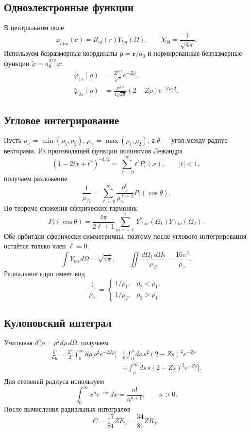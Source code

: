 \documentclass[../final.tex]{subfiles}
\begin{document}
\subsection*{Одноэлектронные функции}

В центральном поле
\[
    \varphi_{nlm}(\mathbf r)=R_{nl}(r)Y_{lm}(\Omega),\qquad
    Y_{00}=\frac1{\sqrt{4\pi}}.
\]
Используем безразмерные координаты $\boldsymbol\rho=\mathbf r/a_0$
и нормированные безразмерные функции
$\widetilde\varphi=a_0^{3/2}\varphi$:
\begin{align*}
    \widetilde\varphi_{1s}(\rho)
       &=\frac{Z^{3/2}}{\sqrt\pi}e^{-Z\rho},\\
    \widetilde\varphi_{2s}(\rho)
       &=\frac{Z^{3/2}}{4\sqrt{2\pi}}
           (2-Z\rho)e^{-Z\rho/2}.
\end{align*}

\subsection*{Угловое интегрирование}

Пусть $\rho_< =\min(\rho_1,\rho_2)$,
$\rho_> =\max(\rho_1,\rho_2)$, а $\theta$ --- угол между радиус-векторами.
Из производящей функции полиномов Лежандра
\[
    (1-2tx+t^2)^{-1/2}=\sum_{\ell=0}^\infty t^\ell P_\ell(x),
    \qquad |t|<1,
\]
получаем разложение
\[
    \frac1{\rho_{12}}
       =\sum_{\ell=0}^\infty
          \frac{\rho_<^{\ell}}{\rho_>^{\ell+1}}P_\ell(\cos\theta).
\]
По теореме сложения сферических гармоник
\[
    P_\ell(\cos\theta)=\frac{4\pi}{2\ell+1}
       \sum_{m=-\ell}^{\ell}Y_{\ell m}^*(\Omega_1)Y_{\ell m}(\Omega_2).
\]
Обе орбитали сферически симметричны, поэтому после углового
интегрирования остаётся только член $\ell=0$:
\[
    \int Y_{00}\,d\Omega=\sqrt{4\pi},\qquad
    \iint\frac{d\Omega_1\,d\Omega_2}{\rho_{12}}
       =\frac{16\pi^2}{\rho_>}.
\]
Радиальное ядро имеет вид
\[
    \frac1{\rho_>}=
       \begin{cases}
           1/\rho_1,&\rho_2<\rho_1,\\
           1/\rho_2,&\rho_2>\rho_1.
       \end{cases}
\]

\subsection*{Кулоновский интеграл}

Учитывая $d^3\rho=\rho^2d\rho\,d\Omega$, получаем
\begin{align*}
    \frac C{E_{\mathrm h}}
      =\frac{Z^6}{2}\int_0^\infty d\rho\,\rho^2e^{-2Z\rho}
       \Biggl[&\frac1\rho\int_0^\rho
          ds\,s^2(2-Zs)^2e^{-Zs}\\
          &+\int_\rho^\infty ds\,s(2-Zs)^2e^{-Zs}\Biggr].
\end{align*}
Для степеней радиуса используем
\[
    \int_0^\infty x^n e^{-ax}\,dx=\frac{n!}{a^{n+1}},\qquad a>0.
\]
После вычисления радиальных интегралов
\[
    C=\frac{17}{81}ZE_{\mathrm h}=\frac{34}{81}ZR_E.
\]
\end{document}

